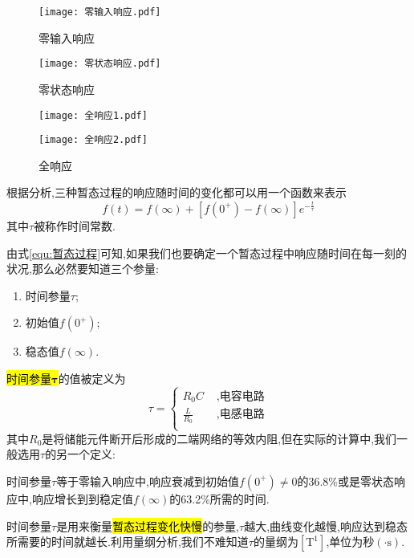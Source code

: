 \begin{figure}[htbp]
    \centering
    \begin{minipage}{0.48\textwidth}
        \centering
        \texttt{[image: 零输入响应.pdf]}
        \caption{零输入响应}
        \vspace{0.8cm}
    \end{minipage}
    \begin{minipage}{0.48\textwidth}
        \centering
        \texttt{[image: 零状态响应.pdf]}
        \caption{零状态响应}
        \vspace{0.8cm}
    \end{minipage}
    \begin{minipage}{0.48\textwidth}
        \centering
        \texttt{[image: 全响应1.pdf]}
    \end{minipage}
    \begin{minipage}{0.48\textwidth}
        \centering
        \texttt{[image: 全响应2.pdf]}
    \end{minipage}
    \caption{全响应}
\end{figure}
根据分析,三种暂态过程的响应随时间的变化都可以用一个函数来表示
\begin{equation}\label{equ:暂态过程}
    f\left( t \right) =f\left( \infty \right) +\left[ f\left( 0^+ \right) -f\left( \infty \right) \right] e^{-\frac{t}{\tau}}
\end{equation}
其中$\tau $被称作时间常数.

由式\ref{equ:暂态过程}可知,如果我们也要确定一个暂态过程中响应随时间在每一刻的状况,那么必然要知道三个参量:
\begin{enumerate}
    \item[\circledtext{1}]  时间参量$\tau $;
    \item[\circledtext{2}]  初始值$f\left( 0^+ \right) $;
    \item[\circledtext{3}]  稳态值$f\left( \infty \right) $.
\end{enumerate}
\hl{时间参量$\boldsymbol{\tau } $}的值被定义为
\begin{equation*}
    \tau =\left\{ \begin{aligned}
        R_0C\,\, &,\text{电容电路}\\
        \frac{L}{R_0}\,\, &,\text{电感电路}\\
    \end{aligned} \right. 
\end{equation*}
其中$R_0$是将储能元件断开后形成的二端网络的等效内阻,但在实际的计算中,我们一般选用$\tau $的另一个定义:
\begin{definition}
    \Par 时间参量$\tau $等于零输入响应中,响应衰减到初始值$f\left( 0^+ \right) \ne 0$的36.8\%或是零状态响应中,响应增长到到稳定值$f\left( \infty \right) $的63.2\%所需的时间.
\end{definition}
\Par 时间参量$\tau $是用来衡量\hl{暂态过程变化快慢}的参量,$\tau $越大,曲线变化越慢,响应达到稳态所需要的时间就越长.利用量纲分析,我们不难知道$\tau $的量纲为$\left[ \mathrm{T}^1 \right] $,单位为秒$\left( \cdot \mathrm{s} \right) $.


